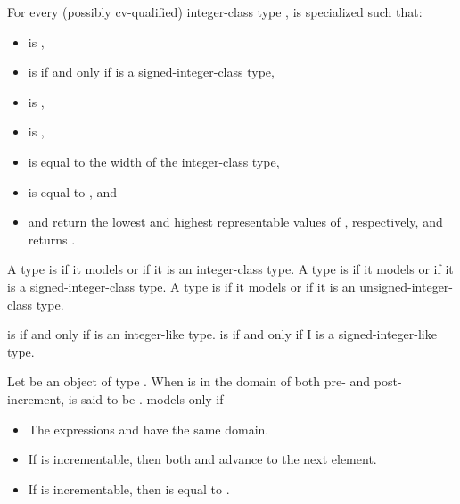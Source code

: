 \pnum
For every (possibly cv-qualified) integer-class type ,
 is specialized such that:
\begin{itemize}
\item
   is ,
\item
   is 
  if and only if  is a signed-integer-class type,
\item
   is ,
\item
   is ,
\item
   is equal to the width of the integer-class type,
\item
   is equal to , and
\item
   and  return
  the lowest and highest representable values of , respectively, and
   returns .
\end{itemize}

\pnum
A type  is 
if it models  or
if it is an integer-class type.
A type  is 
if it models  or
if it is a signed-integer-class type.
A type  is 
if it models  or
if it is an unsigned-integer-class type.

\pnum
{} is 
if and only if  is an integer-like type.
 is 
if and only if I is a signed-integer-like type.

\pnum
Let  be an object of type . When  is in the domain of
both pre- and post-increment,  is said to be .
 models  only if
\begin{itemize}
\item The expressions  and  have the same domain.
\item If  is incrementable, then both 
  and  advance  to the next element.
\item If  is incrementable, then
   is equal to
  .
\end{itemize}


